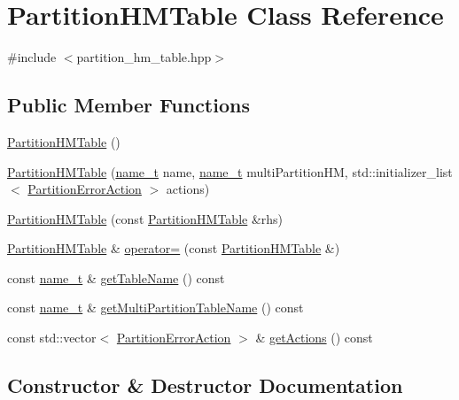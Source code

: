 \hypertarget{classPartitionHMTable}{}\section{Partition\+H\+M\+Table Class Reference}
\label{classPartitionHMTable}


{\ttfamily \#include $<$partition\+\_\+hm\+\_\+table.\+hpp$>$}

\subsection*{Public Member Functions}
\begin{DoxyCompactItemize}
\item 
\hyperlink{classPartitionHMTable_ada8e00db4e6422d1f05fc878297a3f32}{Partition\+H\+M\+Table} ()
\item 
\hyperlink{classPartitionHMTable_a2b472c51bec3e3dc91a283bbfa7744a5}{Partition\+H\+M\+Table} (\hyperlink{structname__t}{name\+\_\+t} name, \hyperlink{structname__t}{name\+\_\+t} multi\+Partition\+HM, std\+::initializer\+\_\+list$<$ \hyperlink{classPartitionErrorAction}{Partition\+Error\+Action} $>$ actions)
\item 
\hyperlink{classPartitionHMTable_a15458de0c65001f1af1cf0123dfe3bce}{Partition\+H\+M\+Table} (const \hyperlink{classPartitionHMTable}{Partition\+H\+M\+Table} \&rhs)
\item 
\hyperlink{classPartitionHMTable}{Partition\+H\+M\+Table} \& \hyperlink{classPartitionHMTable_a4b312053ebf89b90dc5b7a59229cecb5}{operator=} (const \hyperlink{classPartitionHMTable}{Partition\+H\+M\+Table} \&)
\item 
const \hyperlink{structname__t}{name\+\_\+t} \& \hyperlink{classPartitionHMTable_af6671883ac53f98c718e81e29ff4fb82}{get\+Table\+Name} () const 
\item 
const \hyperlink{structname__t}{name\+\_\+t} \& \hyperlink{classPartitionHMTable_a46d19fd256d0f82b2a155c32f11046ad}{get\+Multi\+Partition\+Table\+Name} () const 
\item 
const std\+::vector$<$ \hyperlink{classPartitionErrorAction}{Partition\+Error\+Action} $>$ \& \hyperlink{classPartitionHMTable_a2e33c21560813f09047288d50a051edf}{get\+Actions} () const 
\end{DoxyCompactItemize}


\subsection{Constructor \& Destructor Documentation}
